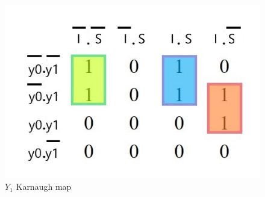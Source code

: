 \documentclass[../../e3_tp3_main.tex]{subfiles}
\begin{document}
\begin{figure}[H]
	\centering
	\includegraphics[scale=0.8]{figures/e3_tp3_ej1_mealy_y1_kmap.jpg}
	\caption{$Y_1$ Karnaugh map}
\end{figure}
\end{document}
